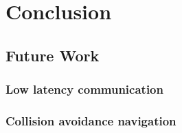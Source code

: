 
\chapter{Conclusion}
\label{chap:conclusion}

\section{Future Work}

\subsection{Low latency communication}

\subsection{Collision avoidance navigation}